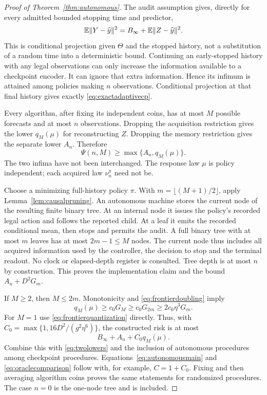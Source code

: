 \begin{proof}[Proof of Theorem~\ref{thm:autonomous}]
The audit assumption gives, directly for every admitted bounded stopping time and predictor,
\begin{equation}\label{eq:auditoracle}
 \mathbb E\|Y-\widehat y\|^2=B_\infty+\mathbb E\|Z-\widehat y\|^2.
\end{equation}
This is conditional projection given $\Theta$ and the stopped history, not a substitution of a random time into a deterministic bound. Continuing an early-stopped history with any legal observations can only increase the information available to a checkpoint encoder. It can ignore that extra information. Hence its infimum is attained among policies making $n$ observations. Conditional projection at that final history gives exactly \eqref{eq:exactadaptivecp}.

Every algorithm, after fixing its independent coins, has at most $M$ possible forecasts and at most $n$ observations. Dropping the acquisition restriction gives the lower $q_M(\mu)$ for reconstructing $Z$. Dropping the memory restriction gives the separate lower $A_n$. Therefore
\begin{equation}\label{eq:twolowers}
 \Psi(n,M)\ge\max\{A_n,q_M(\mu)\}.
\end{equation}
The two infima have not been interchanged. The response law $\mu$ is policy independent; each acquired law $\nu_n^\pi$ need not be.

Choose a minimizing full-history policy $\pi$. With $m=\lfloor(M+1)/2\rfloor$, apply Lemma~\ref{lem:causalpruning}. An autonomous machine stores the current node of the resulting finite binary tree. At an internal node it issues the policy's recorded legal action and follows the reported child. At a leaf it emits the recorded conditional mean, then stops and permits the audit. A full binary tree with at most $m$ leaves has at most $2m-1\le M$ nodes. The current node thus includes all acquired information used by the controller, the decision to stop and the terminal readout. No clock or elapsed-depth register is consulted. Tree depth is at most $n$ by construction. This proves the implementation claim and the bound $A_n+D^2G_m$.

If $M\ge2$, then $M\le2m$. Monotonicity and \eqref{eq:frontierdoubling} imply
\[
 q_M(\mu)\ge c_0G_M\ge c_0G_{2m}\ge2c_0\eta^3G_m.
\]
For $M=1$ use \eqref{eq:frontierquantization} directly. Thus, with
$C_0=\max\{1,16D^2/(g^2\eta^6)\}$, the constructed risk is at most
\[
 B_\infty+A_n+C_0q_M(\mu).
\]
Combine this with \eqref{eq:twolowers} and the inclusion of autonomous procedures among checkpoint procedures. Equations~\eqref{eq:autonomousmain} and \eqref{eq:oraclecomparison} follow with, for example, $C=1+C_0$. Fixing and then averaging algorithm coins proves the same statements for randomized procedures. The case $n=0$ is the one-node tree and is included.
\end{proof}

